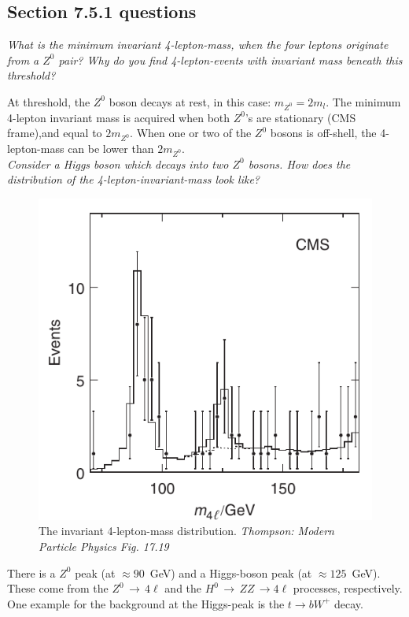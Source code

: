 \documentclass[twocolumn]{article}
\begin{document}
\subsection{Section 7.5.1 questions}
\textit{What is the minimum invariant 4-lepton-mass, when the four leptons originate from a $Z^0$ pair? Why do you find 4-lepton-events with invariant mass beneath this threshold?}\\
\par At threshold, the $Z^0$ boson decays at rest, in this case: $m_{Z^0} = 2 m_l$. The minimum 4-lepton invariant mass is acquired when both $Z^0$'s are stationary (CMS frame),and equal to $2m_{Z^0}$. When one or two of the $Z^0$ bosons is off-shell, the 4-lepton-mass can be lower than $2 m_{Z^0}$. \\[14pt]
\textit{Consider a Higgs boson which decays into two $Z^0$ bosons. How does the distribution of the 4-lepton-invariant-mass look like?}\\
\begin{figure}
\centering
\includegraphics[scale=0.5]{Images/Z0peak.png}
\caption{The invariant 4-lepton-mass distribution. \textit{Thompson: Modern Particle Physics Fig. 17.19}}
\end{figure}
\par There is a $Z^0$ peak (at $\approx 90$~GeV) and a Higgs-boson peak (at $\approx 125$~GeV). These come from the $Z^0 \, \rightarrow \, 4\ell$ and the $H^0 \, \rightarrow \, Z Z \, \rightarrow 4 \ell$ processes, respectively.  One example for the background at the Higgs-peak is the $t \rightarrow bW^+$ decay.\\[14pt]
\end{document}
